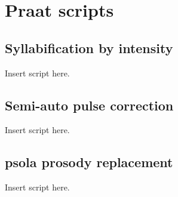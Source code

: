 \chapter{Praat scripts\label{apx:PraatScripts}}

\section{Syllabification by intensity}
Insert script here.

\section{Semi-auto pulse correction}
Insert script here.

\section{\ac{psola} prosody replacement}
Insert script here.
